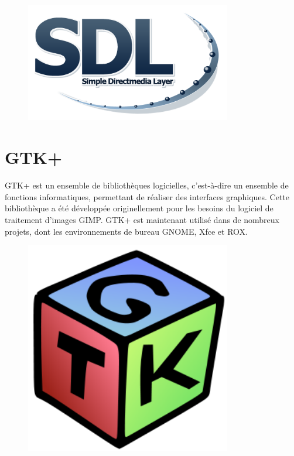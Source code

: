 \documentclass[12pt, a4paper]{report}
\begin{document}
\begin{figure}[!h]
\begin{center} \includegraphics[width=0.8\textwidth]{images/sdl.png} \end{center}
\end{figure}



\newpage


\section {GTK+}

GTK+  est un ensemble de bibliothèques logicielles, c'est-à-dire un ensemble de fonctions informatiques, permettant de réaliser des interfaces graphiques. Cette bibliothèque a été développée originellement pour les besoins du logiciel de traitement d'images GIMP. GTK+ est maintenant utilisé dans de nombreux projets, dont les environnements de bureau GNOME, Xfce et ROX.

\begin{figure}[!h]
\begin{center} \includegraphics[width=0.8\textwidth]{images/gtk.png} \end{center}
\end{figure}
\end{document}

